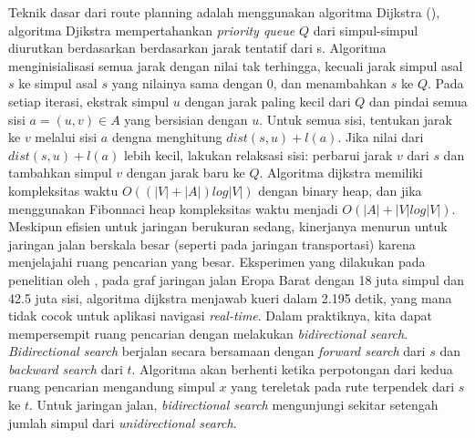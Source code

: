 Teknik dasar dari route planning adalah menggunakan algoritma Dijkstra (\cite{Dijkstra59}), algoritma Djikstra mempertahankan \textit{priority queue} $Q$ dari simpul-simpul diurutkan berdasarkan berdasarkan jarak tentatif dari s. Algoritma menginisialisasi semua jarak dengan nilai tak terhingga, kecuali jarak simpul asal $s$ ke simpul asal $s$ yang nilainya sama dengan 0, dan menambahkan $s$ ke $Q$. Pada setiap iterasi, ekstrak simpul $u$ dengan jarak paling kecil dari $Q$ dan pindai semua sisi $a=(u,v) \in A$ yang bersisian dengan $u$. Untuk semua sisi, tentukan jarak ke $v$ melalui sisi $a$ dengna menghitung $dist(s,u) + l(a)$. Jika nilai dari $dist(s,u) + l(a)$ lebih kecil, lakukan relaksasi sisi: perbarui jarak $v$ dari $s$ dan tambahkan simpul $v$ dengan jarak baru ke $Q$. Algoritma dijkstra memiliki kompleksitas waktu $O((|V|+|A|)log|V|)$ dengan binary heap, dan jika menggunakan Fibonnaci heap kompleksitas waktu menjadi $O(|A|+|V|log|V|)$. Meskipun efisien untuk jaringan berukuran sedang, kinerjanya menurun untuk jaringan jalan berskala besar (seperti pada jaringan transportasi) karena menjelajahi ruang pencarian yang besar. Eksperimen yang dilakukan pada penelitian oleh \cite{Bast2015}, pada graf jaringan jalan Eropa Barat dengan 18 juta simpul dan 42.5 juta sisi, algoritma dijkstra menjawab kueri dalam 2.195 detik, yang mana tidak cocok untuk aplikasi navigasi \textit{real-time}. Dalam praktiknya, kita dapat mempersempit ruang pencarian dengan melakukan \textit{bidirectional search}. \textit{Bidirectional search} berjalan secara bersamaan dengan \textit{forward search} dari $s$ dan \textit{backward search} dari $t$. Algoritma akan berhenti ketika perpotongan dari kedua ruang pencarian mengandung simpul $x$ yang tereletak pada rute terpendek dari $s$ ke $t$. Untuk jaringan jalan, \textit{bidirectional search} mengunjungi sekitar setengah jumlah simpul dari \textit{unidirectional search}.

